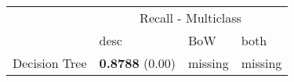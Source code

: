 \begin{tabular}{|l|l|l|l| }
\hline
 &  \multicolumn{3}{c|}{ Recall - Multiclass} \\
\cline{2-4} & desc & BoW & both \\ \hline
Decision Tree & {\bf 0.8788} (0.00) & missing  & missing \\
\hline
\end{tabular}